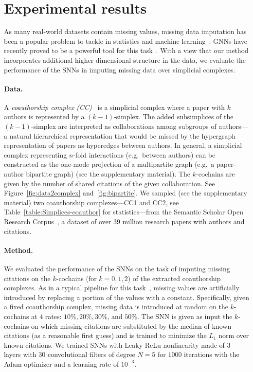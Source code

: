 \section{Experimental results}

As many real-world datasets contain missing values, missing data imputation has been a popular problem to tackle in statistics and machine learning~\cite{little1986statistical, nelwamondo2007missing}.
GNNs have recently proved to be a powerful tool for this task~\cite{spinelli2020neural}.
With a view that our method incorporates additional higher-dimensional structure in the data, we evaluate the performance of the SNNs in imputing missing data over simplicial complexes.

\paragraph{Data.}
A \emph{coauthorship complex (CC)}~\cite{patania2017} is a simplicial complex where a paper with $k$ authors is represented by a $(k-1)$-simplex.
The added subsimplices of the $(k-1)$-simplex are interpreted as collaborations among subgroups of authors---a natural hierarchical representation that would be missed by the hypergraph representation of papers as hyperedges between authors.
In general, a simplicial complex representing $n$-fold interactions (e.g.\ between authors) can be constructed as the one-mode projection of a multipartite graph (e.g.\ a paper-author bipartite graph) (see the supplementary material).
The $k$-cochains are given by the number of shared citations of the given collaboration.
See Figure~\ref{fig:data2complex} and~\ref{fig:bipartite}.
We sampled (see the supplementary material) two coauthorship complexes---CC1 and CC2, see Table~\ref{table:Simplices-coauthor} for statistics---from the Semantic Scholar Open Research Corpus~\cite{ammar18NAACL}, a dataset of over $39$ million research papers with authors and citations.

\paragraph{Method.}
We evaluated the performance of the SNNs on the task of imputing missing citations on the $k$-cochains (for $k=0,1,2$) of the extracted coauthorship complexes.
As in a typical pipeline for this task~\cite{nelwamondo2007missing}, missing values are artificially introduced by replacing a portion of the values with a constant.
Specifically, given a fixed coauthorship complex, missing data is introduced at random on the $k$-cochains at $4$ rates: $10\%, 20\%,  30\%$, and $50\%$.
The SNN is given as input the $k$-cochains on which missing citations are substituted by the median of known citations (as a reasonable first guess) and is trained to minimize the $L_1$ norm over known citations.
We trained SNNs with Leaky ReLu nonlinearity made of $3$ layers with $30$ convolutional filters of degree $N=5$ for $1000$ iterations with the Adam optimizer and a learning rate of $10^{-3}$.

